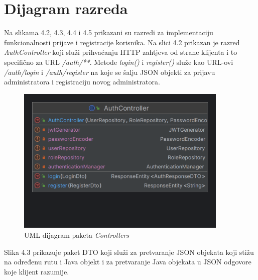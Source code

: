 			
			\eject
			
			
		\section{Dijagram razreda}
		

			Na slikama 4.2, 4.3, 4.4 i 4.5 prikazani su razredi za implementaciju funkcionalnosti prijave i registracije korisnika. Na slici 4.2 prikazan je razred \textit{AuthController} koji služi prihvaćanju HTTP zahtjeva od strane klijenta i to specifično za URL \textit{/auth/**}. Metode \textit{login()} i \textit{register()} služe kao URL-ovi \textit{/auth/login} i \textit{/auth/register} na koje se šalju JSON objekti za prijavu administratora i registraciju novog administratora.
			
			\begin{figure}[htbp]
				\centering
				\includegraphics[width=0.9\textwidth]{slike/controllersUML}
				\caption{UML dijagram paketa \textit{Controllers}}
				\label{fig:controllersUML}
			\end{figure}
			
			Slika 4.3 prikazuje paket DTO koji služi za pretvaranje JSON objekata koji stižu na određenu rutu i Java objekt i za pretvaranje Java objekata u JSON odgovore koje klijent razumije.
			
